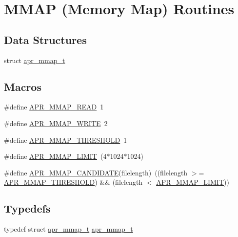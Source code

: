 \hypertarget{group__apr__mmap}{\section{M\-M\-A\-P (Memory Map) Routines}
\label{group__apr__mmap}
}
\subsection*{Data Structures}
\begin{DoxyCompactItemize}
\item 
struct \hyperlink{structapr__mmap__t}{apr\-\_\-mmap\-\_\-t}
\end{DoxyCompactItemize}
\subsection*{Macros}
\begin{DoxyCompactItemize}
\item 
\#define \hyperlink{group__apr__mmap_gac231fdf15d2d29802e0abbc5d0cf25b8}{A\-P\-R\-\_\-\-M\-M\-A\-P\-\_\-\-R\-E\-A\-D}~1
\item 
\#define \hyperlink{group__apr__mmap_gac2eb7f697d8bf190e630b85f967c8273}{A\-P\-R\-\_\-\-M\-M\-A\-P\-\_\-\-W\-R\-I\-T\-E}~2
\item 
\#define \hyperlink{group__apr__mmap_ga19d1916e7b64bfb1a969648fe7b0846a}{A\-P\-R\-\_\-\-M\-M\-A\-P\-\_\-\-T\-H\-R\-E\-S\-H\-O\-L\-D}~1
\item 
\#define \hyperlink{group__apr__mmap_ga548e49b3c9e8265ad8ccf70994f4fe25}{A\-P\-R\-\_\-\-M\-M\-A\-P\-\_\-\-L\-I\-M\-I\-T}~(4$\ast$1024$\ast$1024)
\item 
\#define \hyperlink{group__apr__mmap_ga4f469432098e986567576fd4c4ce5adc}{A\-P\-R\-\_\-\-M\-M\-A\-P\-\_\-\-C\-A\-N\-D\-I\-D\-A\-T\-E}(filelength)~((filelength $>$= \hyperlink{group__apr__mmap_ga19d1916e7b64bfb1a969648fe7b0846a}{A\-P\-R\-\_\-\-M\-M\-A\-P\-\_\-\-T\-H\-R\-E\-S\-H\-O\-L\-D}) \&\& (filelength $<$ \hyperlink{group__apr__mmap_ga548e49b3c9e8265ad8ccf70994f4fe25}{A\-P\-R\-\_\-\-M\-M\-A\-P\-\_\-\-L\-I\-M\-I\-T}))
\end{DoxyCompactItemize}
\subsection*{Typedefs}
\begin{DoxyCompactItemize}
\item 
typedef struct \hyperlink{structapr__mmap__t}{apr\-\_\-mmap\-\_\-t} \hyperlink{group__apr__mmap_ga766b01a3e1e0438d06dc88d76f826f80}{apr\-\_\-mmap\-\_\-t}
\end{DoxyCompactItemize}
